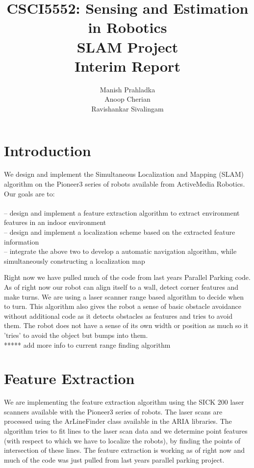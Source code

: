 \documentclass{article}
\begin{document}
\title{\textbf{CSCI5552: Sensing and Estimation in Robotics \\ SLAM Project} \\ Interim Report}
\author{Manish Prahladka\\
				Anoop Cherian\\
				Ravishankar Sivalingam}

\maketitle

\section{Introduction}

We design and implement the Simultaneous Localization and Mapping (SLAM) algorithm on the Pioneer3 series of robots available from ActiveMedia Robotics. Our goals are to:\\ \\
-- design and implement a feature extraction algorithm to extract environment features in an indoor environment\\
-- design and implement a localization scheme based on the extracted feature information \\
-- integrate the above two to develop a automatic navigation algorithm, while simultaneously constructing a localization map 

Right now we have pulled much of the code from last years Parallel Parking code. As of right now our robot can align itself to a wall, detect corner features and make turns. We are using a laser scanner range based algorithm to decide when to turn. This algorithm also gives the robot a sense of basic obstacle avoidance without additional code as it detects obstacles as features and tries to avoid them. The robot does not have a sense of its own width or position as much so it 'tries' to avoid the object but bumps into them. \\

***** add more info to current range finding algorithm

\section{Feature Extraction}

We are implementing the feature extraction algorithm using the SICK 200 laser scanners available with the Pioneer3 series of robots. The laser scans are processed using the ArLineFinder class available in the ARIA libraries. The algorithm tries to fit lines to the laser scan data and we determine point features (with respect to which we have to localize the robots), by finding the points of intersection of these lines. The feature extraction is working as of right now and much of the code was just pulled from last years parallel parking project.\\
\end{document}
